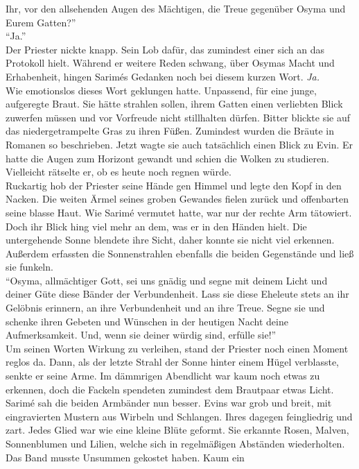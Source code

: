 Ihr, vor den allsehenden Augen des Mächtigen, die Treue gegenüber Osyma und Eurem Gatten?''\\
``Ja.''\\
Der Priester nickte knapp. Sein Lob dafür, das zumindest einer sich an das Protokoll hielt. Während 
er weitere Reden schwang, über Osymas Macht und Erhabenheit, hingen Sarimés Gedanken noch bei 
diesem kurzen Wort. \textit{Ja.}\\
Wie emotionslos dieses Wort geklungen hatte. Unpassend, für eine junge, aufgeregte Braut. Sie hätte 
strahlen sollen, ihrem Gatten einen verliebten Blick zuwerfen müssen und vor Vorfreude nicht 
stillhalten dürfen. Bitter blickte sie auf das niedergetrampelte Gras zu ihren Füßen. Zumindest 
wurden die Bräute in Romanen so beschrieben. Jetzt wagte sie auch tatsächlich einen Blick zu Evin. 
Er hatte die Augen zum Horizont gewandt und schien die Wolken zu studieren. Vielleicht rätselte er, 
ob es heute noch regnen würde.\\
Ruckartig hob der Priester seine Hände gen Himmel und legte den Kopf in den Nacken. Die weiten 
Ärmel seines groben Gewandes fielen zurück und offenbarten seine blasse Haut. Wie Sarimé vermutet 
hatte, war nur der rechte Arm tätowiert. Doch ihr Blick hing viel mehr an dem, was er in den Händen 
hielt. Die untergehende Sonne blendete ihre Sicht, daher konnte sie nicht viel erkennen. Außerdem 
erfassten die Sonnenstrahlen ebenfalls die beiden Gegenstände und ließ sie funkeln. \\
``Osyma, allmächtiger Gott, sei uns gnädig und segne mit deinem Licht und deiner Güte diese Bänder 
der Verbundenheit. Lass sie diese Eheleute stets an ihr Gelöbnis erinnern, an ihre Verbundenheit 
und an ihre Treue. Segne sie und schenke ihren Gebeten und Wünschen in der heutigen Nacht deine 
Aufmerksamkeit. Und, wenn sie deiner würdig sind, erfülle sie!''\\
Um seinen Worten Wirkung zu verleihen, stand der Priester noch einen Moment reglos da. Dann, als 
der letzte Strahl der Sonne hinter einem Hügel verblasste, senkte er seine Arme. Im dämmrigen 
Abendlicht war kaum noch etwas zu erkennen, doch die Fackeln spendeten zumindest dem Brautpaar 
etwas Licht. Sarimé sah die beiden Armbänder nun besser. Evins war grob und breit, mit 
eingravierten Mustern aus Wirbeln und Schlangen. Ihres dagegen feingliedrig und zart. Jedes Glied 
war wie eine kleine Blüte geformt. Sie erkannte Rosen, Malven, Sonnenblumen und Lilien, welche sich 
in regelmäßigen Abständen wiederholten. Das Band musste Unsummen gekostet haben. Kaum ein 
